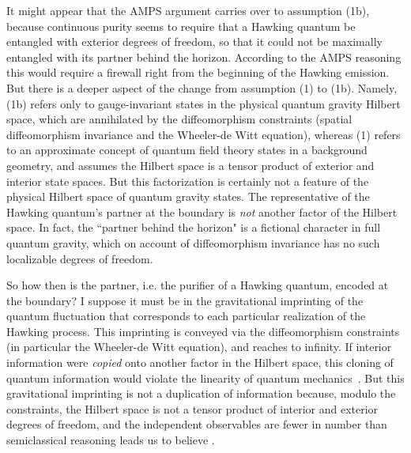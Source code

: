 \documentclass[12pt]{article}
\begin{document}
{It might appear that the AMPS argument carries over to 
assumption (1b), because continuous purity seems to require that
a Hawking quantum be entangled with exterior degrees of freedom, so that it could not  
be maximally entangled with its partner behind the horizon. According to the AMPS 
reasoning this would require 
a firewall right from the beginning of the Hawking emission. But there is a deeper aspect of the
change from assumption (1) to (1b). Namely, (1b) refers only to gauge-invariant states
in the physical quantum gravity Hilbert space, which are annihilated by the diffeomorphism 
constraints (spatial diffeomorphism invariance and the Wheeler-de Witt equation), 
whereas (1) refers to an approximate concept of quantum field theory states in 
a background geometry, and assumes the Hilbert space is a tensor product of
exterior and interior state spaces. But this factorization is certainly not a feature of the
physical Hilbert space of quantum gravity states.
The representative of the Hawking quantum's partner at the boundary 
is {\it not} another factor of the Hilbert space. In fact, the ``partner behind the horizon" is a fictional character in
full quantum gravity, which on account of diffeomorphism invariance has no such localizable degrees of freedom. 

So how then is the partner, i.e. the purifier of a Hawking quantum, encoded at the boundary? 
I suppose it must be in the gravitational imprinting of the quantum 
fluctuation that corresponds to each particular realization of the Hawking process. This imprinting
is conveyed via the diffeomorphism constraints (in particular the Wheeler-de Witt equation), 
and reaches to infinity. 
If interior information were
{\it copied} onto another factor in the Hilbert space, this cloning of quantum information 
would violate the linearity of quantum mechanics~\cite{Wootters:1982zz}.
But this gravitational imprinting is not a duplication of information because, modulo the constraints, 
the Hilbert space is not a tensor product of interior and exterior degrees of freedom, and 
the independent observables are fewer in number than semiclassical
reasoning leads us to believe \cite{Giddings:2005id,Papadodimas:2012aq}.

}
\end{document}
